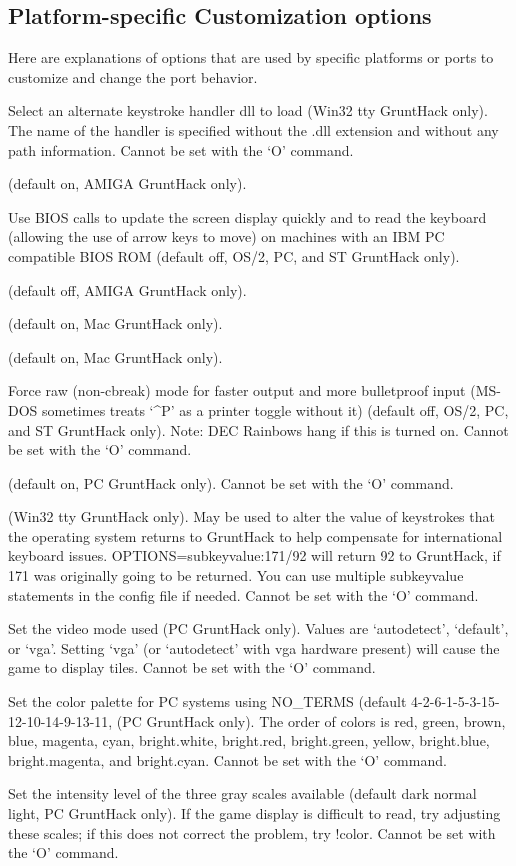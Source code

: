 \subsection*{Platform-specific Customization options}

Here are explanations of options that are used by specific platforms or ports 
to customize and change the port behavior.
\blist{}
\item[\tb{altkeyhandler}]
Select an alternate keystroke handler dll to load (Win32 tty GruntHack only).
The name of the handler is specified without the .dll extension and without any
path information.
Cannot be set with the `O' command.
\item[\tb{altmeta}]
(default on, AMIGA GruntHack only).
\item[\tb{``BIOS    ''}]
Use BIOS calls to update the screen
display quickly and to read the keyboard (allowing the use of arrow
keys to move) on machines with an IBM PC compatible BIOS ROM (default off,
OS/2, PC, and ST GruntHack only).
\item[\tb{flush}]
(default off, AMIGA GruntHack only).
\item[\tb{``MACgraphics''}]
(default on, Mac GruntHack only).
\item[\tb{page\_wait}]
(default on, Mac GruntHack only).
\item[\tb{``rawio   ''}]
Force raw (non-cbreak) mode for faster output and more
bulletproof input (MS-DOS sometimes treats `\^{}P' as a printer toggle
without it) (default off, OS/2, PC, and ST GruntHack only).
Note:  DEC Rainbows hang if this is turned on.
Cannot be set with the `O' command.
\item[\tb{soundcard}]
(default on, PC GruntHack only).
Cannot be set with the `O' command.
\item[\tb{subkeyvalue}]
(Win32 tty GruntHack only).
May be used to alter the value of keystrokes that the operating system
returns to GruntHack to help compensate for international keyboard issues.
OPTIONS=subkeyvalue:171/92
will return 92 to GruntHack, if 171 was originally going to be returned.
You can use multiple subkeyvalue statements in the config file if needed.
Cannot be set with the `O' command.
\item[\tb{video}]
Set the video mode used (PC GruntHack only).
Values are `autodetect', `default', or `vga'.
Setting `vga' (or `autodetect' with vga hardware present) will cause
the game to display tiles. 
Cannot be set with the `O' command.
\item[\tb{videocolors}]
Set the color palette for PC systems using NO\_TERMS
(default 4-2-6-1-5-3-15-12-10-14-9-13-11, (PC GruntHack only).
The order of colors is red, green, brown, blue, magenta, cyan,
bright.white, bright.red, bright.green, yellow, bright.blue,
bright.magenta, and bright.cyan.
Cannot be set with the `O' command.
\item[\tb{videoshades}]
Set the intensity level of the three gray scales available
(default dark normal light, PC GruntHack only).
If the game display is difficult to read, try adjusting these scales;
if this does not correct the problem, try !color.
Cannot be set with the `O' command.
\elist
